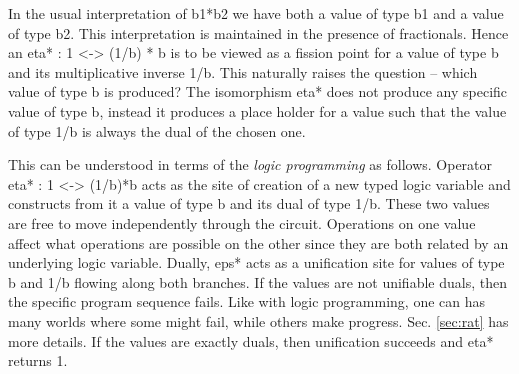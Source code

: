 \documentclass[preprint]{sigplanconf}
\begin{document}
In the usual interpretation of {{b1*b2}} we have both a value of type {{b1}}
and a value of type {{b2}}. This interpretation is maintained in the presence
of fractionals. Hence an {{eta* : 1 <-> (1/b) * b}} is to be viewed as a
fission point for a value of type {{b}} and its multiplicative inverse
{{1/b}}. This naturally raises the question -- which value of type {{b}} is
produced? The isomorphism {{eta*}} does not produce any specific value of
type {{b}}, instead it produces a place holder for a value such that the
value of type {{1/b}} is always the dual of the chosen one.

\begin{multicols}{2}
\begin{center}
\end{center}

\begin{center}
\end{center}  
\end{multicols}


This can be understood in terms of the \emph{logic programming} as
follows. Operator {{eta* : 1 <-> (1/b)*b}} acts as the site of
creation of a new typed logic variable and constructs from it a value
of type {{b}} and its dual of type {{1/b}}. These two values are free
to move independently through the circuit. Operations on one value
affect what operations are possible on the other since they are both
related by an underlying logic variable. Dually, {{eps*}} acts as a
unification site for values of type {{b}} and {{1/b}} flowing along
both branches. If the values are not unifiable duals, then the
specific program sequence fails. Like with logic programming, one can
has many worlds where some might fail, while others make
progress. Sec. \ref{sec:rat} has more details.  If the values are
exactly duals, then unification succeeds and {{eta*}} returns {{1}}.
\end{document}
